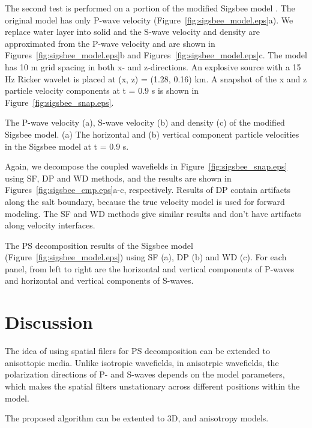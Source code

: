 \documentclass[manuscript,ulem,graphix,revised]{geophysics}
\begin{document}
The second test is performed on a portion of the modified Sigsbee model \citep{paffenholz02}. The original model has only P-wave velocity (Figure~\ref{fig:sigsbee_model.eps}a). We replace water layer into solid and the S-wave velocity and density are approximated from the P-wave velocity and are shown in Figures~\ref{fig:sigsbee_model.eps}b and Figures~\ref{fig:sigsbee_model.eps}c.
The model has 10 m grid spacing in both x- and z-directions. An explosive source with a 15 Hz Ricker wavelet is placed at (x, z) = (1.28, 0.16) km. A snapshot of the x and z particle velocity components at t = 0.9 s is shown in Figure~\ref{fig:sigsbee_snap.eps}.

{
The P-wave velocity (a), S-wave velocity (b) and density (c) of the modified Sigsbee model. 
}
{
(a) The horizontal and (b) vertical component particle velocities in the Sigsbee model at t = 0.9 s.
}

Again, we decompose the coupled wavefields in Figure~\ref{fig:sigsbee_snap.eps} using SF, DP and WD methods, and the results are shown in Figures~\ref{fig:sigsbee_cmp.eps}a-c, respectively. Results of DP contain artifacts along the salt boundary, because the true velocity model is used for forward modeling. The SF and WD methods give similar results and don't have artifacts along velocity interfaces. 

{
The PS decomposition results of the Sigsbee model (Figure~\ref{fig:sigsbee_model.eps}) using SF (a), DP (b) and WD (c). For each panel, from left to right are the horizontal and vertical components of P-waves and horizontal and vertical components of S-waves.
}


\section{Discussion}
\indent\indent
The idea of using spatial filers for PS decomposition can be extended to anisottopic media. Unlike isotropic wavefields, in anisotrpic wavefields, the polarization directions of P- and S-waves depends on the model parameters, which makes the spatial filters unstationary across different positions within the model. 

The proposed algorithm can be extented to 3D, and anisotropy models.

\end{document}
